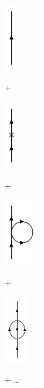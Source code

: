 \begin{minipage}{0.08\textwidth}
	\includegraphics[height=3cm]{./figures/free.png}
\end{minipage}
\begin{minipage}{0.05\textwidth}
	+
\end{minipage}
\begin{minipage}{0.08\textwidth}
	\includegraphics[height=3cm]{./figures/diagramA.png}
\end{minipage}
\begin{minipage}{0.05\textwidth}
	+
\end{minipage}
\begin{minipage}{0.12\textwidth}
	\includegraphics[height=3cm]{./figures/diagramC.png}
\end{minipage}
\begin{minipage}{0.05\textwidth}
	+
\end{minipage}
\begin{minipage}{0.1\textwidth}
	\includegraphics[height=3cm]{./figures/order2.png}
\end{minipage}
\begin{minipage}{0.2\textwidth}
	+ \qquad \dots
\end{minipage}

